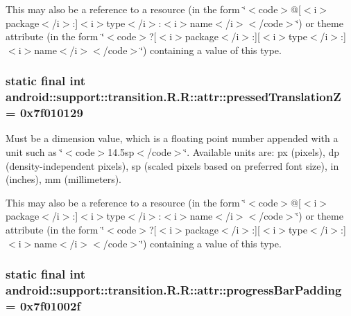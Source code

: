 This may also be a reference to a resource (in the form \char`\"{}$<$code$>$@\mbox{[}$<$i$>$package$<$/i$>$:\mbox{]}$<$i$>$type$<$/i$>$:$<$i$>$name$<$/i$>$$<$/code$>$\char`\"{}) or theme attribute (in the form \char`\"{}$<$code$>$?\mbox{[}$<$i$>$package$<$/i$>$:\mbox{]}\mbox{[}$<$i$>$type$<$/i$>$:\mbox{]}$<$i$>$name$<$/i$>$$<$/code$>$\char`\"{}) containing a value of this type. \hypertarget{classandroid_1_1support_1_1transition_1_1_r_1_1attr_e14fc999a664ea37ca22f0b84b2bba30}{
\subsubsection[{pressedTranslationZ}]{\setlength{\rightskip}{0pt plus 5cm}static final int android::support::transition.R.R::attr::pressedTranslationZ = 0x7f010129}}
\label{classandroid_1_1support_1_1transition_1_1_r_1_1attr_e14fc999a664ea37ca22f0b84b2bba30}


Must be a dimension value, which is a floating point number appended with a unit such as \char`\"{}$<$code$>$14.5sp$<$/code$>$\char`\"{}. Available units are: px (pixels), dp (density-independent pixels), sp (scaled pixels based on preferred font size), in (inches), mm (millimeters). 

This may also be a reference to a resource (in the form \char`\"{}$<$code$>$@\mbox{[}$<$i$>$package$<$/i$>$:\mbox{]}$<$i$>$type$<$/i$>$:$<$i$>$name$<$/i$>$$<$/code$>$\char`\"{}) or theme attribute (in the form \char`\"{}$<$code$>$?\mbox{[}$<$i$>$package$<$/i$>$:\mbox{]}\mbox{[}$<$i$>$type$<$/i$>$:\mbox{]}$<$i$>$name$<$/i$>$$<$/code$>$\char`\"{}) containing a value of this type. \hypertarget{classandroid_1_1support_1_1transition_1_1_r_1_1attr_77eb91eab1f2e3251e9c184b6cda7579}{
\subsubsection[{progressBarPadding}]{\setlength{\rightskip}{0pt plus 5cm}static final int android::support::transition.R.R::attr::progressBarPadding = 0x7f01002f}}
\label{classandroid_1_1support_1_1transition_1_1_r_1_1attr_77eb91eab1f2e3251e9c184b6cda7579}


